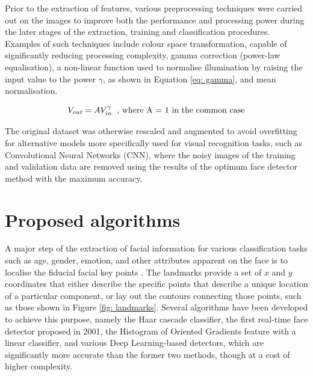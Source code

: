 \documentclass[conference]{IEEEtran}
\begin{document}
Prior to the extraction of features, various preprocessing techniques were carried out on the images to improve both the performance and processing power during the later stages of the extraction, training and classification procedures. 
Examples of such techniques include colour space transformation, capable of significantly reducing processing complexity, gamma correction (power-law equalisation), a non-linear function used to normalise illumination by raising the input value to the power $\gamma$, as shown in Equation \ref{eq: gamma}, and mean normalisation.

\begin{equation}
V_{out} = AV_{in}^{\gamma} \hspace{0.2cm} \text{, where  A = 1 in the common case}
\label{eq: gamma}
\end{equation}


The original dataset was otherwise rescaled and augmented to avoid overfitting for alternative models more specifically used for visual recognition tasks, such as Convolutional Neural Networks (CNN), where the noisy images of the training and validation data are removed using the results of the optimum face detector method with the maximum accuracy. %

\section{Proposed algorithms} \label{s-algorithms}


A major step of the extraction of facial information for various classification tasks such as age, gender, emotion, and other attributes apparent on the face is to localise the fiducial facial key points \cite{landmark_lit}. The landmarks provide a set of $x$ and $y$ coordinates that either describe the specific points that describe a unique location of a particular component, or lay out the contours connecting those points, such as those shown in Figure \ref{fig: landmarks}.
Several algorithms have been developed to achieve this purpose, namely the Haar cascade classifier, the first real-time face detector proposed in 2001, the Histogram of Oriented Gradients feature with a linear classifier, and various Deep Learning-based detectors, which are significantly more accurate than the former two methods, though at a cost of higher complexity.
\end{document}
